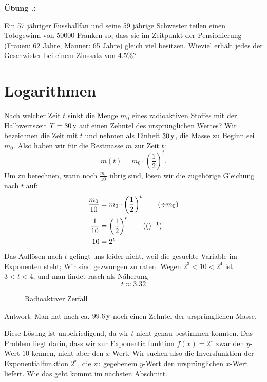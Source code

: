 \documentclass[%
11pt,%
twoside,%
titlepage,%
german,%
headsepline%
]{scrartcl}
\newcommand{\faEyeLightGray}{\textcolor{lightgray}{\faEye}} %
\newcommand{\concatueb}[1]{ueb:#1}%
\newcommand{\concatlsg}[1]{lsg:#1}%
\newcounter{uebcounter}[section]
\renewcommand{\theuebcounter}{\thesection.\arabic{uebcounter}}  %
\newcommand{\uebh}[2]{%
 \refstepcounter{uebcounter} %
 \par\noindent\textbf{Übung \theuebcounter:}\label{\concatueb{#1}} %
    #2
    \hfill\hyperref[\concatlsg{#1}]{\faEyeLightGray}
    \vspace{\parskip}
}
\begin{document}
\uebh{}{
Ein 57 jähriger Fussballfan und seine 59 jährige Schwester teilen einen Totogewinn von 50000 Franken so, dass sie im Zeitpunkt der Pensionierung (Frauen: 62 Jahre, Männer: 65 Jahre) gleich viel besitzen. Wieviel erhält jedes der Geschwister bei einem Zinssatz von 4.5\%?
}

\clearpage

\section{Logarithmen}
\begin{bsp}
Nach welcher Zeit $t$ sinkt die Menge $m_0$ eines radioaktiven Stoffes mit der Halbwertszeit $T=\unit[30]{y}$ auf einen Zehntel des ursprünglichen Wertes? Wir bezeichnen die Zeit mit $t$ und nehmen als Einheit $\unit[30]{y}$, die Masse zu Beginn sei $m_0$. Also haben wir für die Restmasse $m$ zur Zeit $t$:
$$m(t)=m_0\cdot\left(\frac{1}{2}\right)^t.$$
Um zu berechnen, wann noch $\frac{m_0}{10}$ übrig sind, lösen wir die zugehörige Gleichung nach $t$ auf:
    \begin{align*}
    \frac{m_0}{10}&=m_0\cdot\left(\frac{1}{2}\right)^t\tag{$\div m_0$}\\
    \frac{1}{10}&=\left(\frac{1}{2}\right)^t\tag{$()^{-1}$}\\
    10&=2^t
    \end{align*}
    Das Auflösen nach $t$ gelingt uns leider nicht, weil die gesuchte Variable
    im Exponenten steht; Wir sind gezwungen zu raten. Wegen
    $2^3<10<2^4$ ist $3<t<4$, und man findet rasch als Näherung
    $$t\approx3.32$$    
\begin{figure}
\begin{center}
\end{center}
\caption{Radioaktiver Zerfall}\label{zerfall}
\end{figure}
   Antwort: Man hat nach ca. $\unit[99.6]{y}$
    noch einen Zehntel der ursprünglichen Masse.
    \end{bsp}
  Diese Lösung ist unbefriedigend, da wir $t$ nicht genau bestimmen
  konnten. Das Problem liegt darin, dass wir zur Exponentialfunktion $f(x)=2^x$ zwar den $y$-Wert $10$ kennen, nicht aber den $x$-Wert. Wir suchen also die Inversfunktion der Exponentialfunktion $2^x$, die zu gegebenem $y$-Wert den ursprünglichen $x$-Wert liefert. Wie das geht kommt im nächsten Abschnitt.
  
\end{document}
